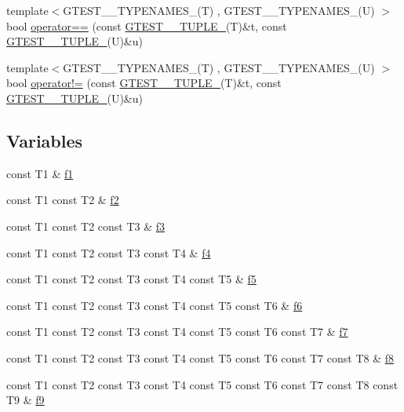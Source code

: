 \begin{DoxyCompactItemize}
\item 
{\footnotesize template$<$G\+T\+E\+S\+T\+\_\+\_\+\+T\+Y\+P\+E\+N\+A\+M\+E\+S\+\_\+(\+T) , G\+T\+E\+S\+T\+\_\+\_\+\+T\+Y\+P\+E\+N\+A\+M\+E\+S\+\_\+(\+U) $>$ }\\bool \hyperlink{namespacestd_1_1tr1_af4516de784404381f9b14797694b6311}{operator==} (const \hyperlink{namespacestd_1_1tr1_aa636d3269bf1f368a7bc09ff158bc482}{G\+T\+E\+S\+T\+\_\+\_\+\+T\+U\+P\+L\+E\+\_\+}(T)\&t, const \hyperlink{namespacestd_1_1tr1_aa636d3269bf1f368a7bc09ff158bc482}{G\+T\+E\+S\+T\+\_\+\_\+\+T\+U\+P\+L\+E\+\_\+}(U)\&u)
\item 
{\footnotesize template$<$G\+T\+E\+S\+T\+\_\+\_\+\+T\+Y\+P\+E\+N\+A\+M\+E\+S\+\_\+(\+T) , G\+T\+E\+S\+T\+\_\+\_\+\+T\+Y\+P\+E\+N\+A\+M\+E\+S\+\_\+(\+U) $>$ }\\bool \hyperlink{namespacestd_1_1tr1_a058882c51de469b5e78d29076f864940}{operator!=} (const \hyperlink{namespacestd_1_1tr1_aa636d3269bf1f368a7bc09ff158bc482}{G\+T\+E\+S\+T\+\_\+\_\+\+T\+U\+P\+L\+E\+\_\+}(T)\&t, const \hyperlink{namespacestd_1_1tr1_aa636d3269bf1f368a7bc09ff158bc482}{G\+T\+E\+S\+T\+\_\+\_\+\+T\+U\+P\+L\+E\+\_\+}(U)\&u)
\end{DoxyCompactItemize}
\subsection*{Variables}
\begin{DoxyCompactItemize}
\item 
const T1 \& \hyperlink{namespacestd_1_1tr1_a9c0fa65b105f8e2f58ba59ecf75fd000}{f1}
\item 
const T1 const T2 \& \hyperlink{namespacestd_1_1tr1_a87dd9e009868361317f587126dba63d4}{f2}
\item 
const T1 const T2 const T3 \& \hyperlink{namespacestd_1_1tr1_a0f7c3b47d27d42d82d1a333ea420ce4e}{f3}
\item 
const T1 const T2 const T3 const T4 \& \hyperlink{namespacestd_1_1tr1_adc796e02b7385d526aff708189564f67}{f4}
\item 
const T1 const T2 const T3 const T4 const T5 \& \hyperlink{namespacestd_1_1tr1_a9c1eb66b2b2fa321942af95405232a0d}{f5}
\item 
const T1 const T2 const T3 const T4 const T5 const T6 \& \hyperlink{namespacestd_1_1tr1_a6b62f32e1e3e21bceb94eb46c4cbfd56}{f6}
\item 
const T1 const T2 const T3 const T4 const T5 const T6 const T7 \& \hyperlink{namespacestd_1_1tr1_a2185f3a1c07f2df072c39cb91ffa89a4}{f7}
\item 
const T1 const T2 const T3 const T4 const T5 const T6 const T7 const T8 \& \hyperlink{namespacestd_1_1tr1_ab998afa41cea8d6d26d7e4288b0bf974}{f8}
\item 
const T1 const T2 const T3 const T4 const T5 const T6 const T7 const T8 const T9 \& \hyperlink{namespacestd_1_1tr1_a216d2c7cdfaaf415caba2f88e2c34413}{f9}
\end{DoxyCompactItemize}


